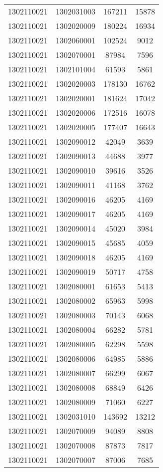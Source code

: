 \begin{longtable}[h]{llcc}
		1302110021 & 1302031003 & 167211 & 15878\\
		1302110021 & 1302020009 & 180224 & 16934\\
		1302110021 & 1302060001 & 102524 & 9012\\
		1302110021 & 1302070001 & 87984 & 7596\\
		1302110021 & 1302101004 & 61593 & 5861\\
		1302110021 & 1302020003 & 178130 & 16762\\
		1302110021 & 1302020001 & 181624 & 17042\\
		1302110021 & 1302020006 & 172516 & 16078\\
		1302110021 & 1302020005 & 177407 & 16643\\
		1302110021 & 1302090012 & 42049 & 3639\\
		1302110021 & 1302090013 & 44688 & 3977\\
		1302110021 & 1302090010 & 39616 & 3526\\
		1302110021 & 1302090011 & 41168 & 3762\\
		1302110021 & 1302090016 & 46205 & 4169\\
		1302110021 & 1302090017 & 46205 & 4169\\
		1302110021 & 1302090014 & 45020 & 3984\\
		1302110021 & 1302090015 & 45685 & 4059\\
		1302110021 & 1302090018 & 46205 & 4169\\
		1302110021 & 1302090019 & 50717 & 4758\\
		1302110021 & 1302080001 & 61653 & 5413\\
		1302110021 & 1302080002 & 65963 & 5998\\
		1302110021 & 1302080003 & 70143 & 6068\\
		1302110021 & 1302080004 & 66282 & 5781\\
		1302110021 & 1302080005 & 62298 & 5598\\
		1302110021 & 1302080006 & 64985 & 5886\\
		1302110021 & 1302080007 & 66299 & 6067\\
		1302110021 & 1302080008 & 68849 & 6426\\
		1302110021 & 1302080009 & 71060 & 6227\\
		1302110021 & 1302031010 & 143692 & 13212\\
		1302110021 & 1302070009 & 94089 & 8808\\
		1302110021 & 1302070008 & 87873 & 7817\\
		1302110021 & 1302070007 & 87006 & 7685\\

\end{longtable}
